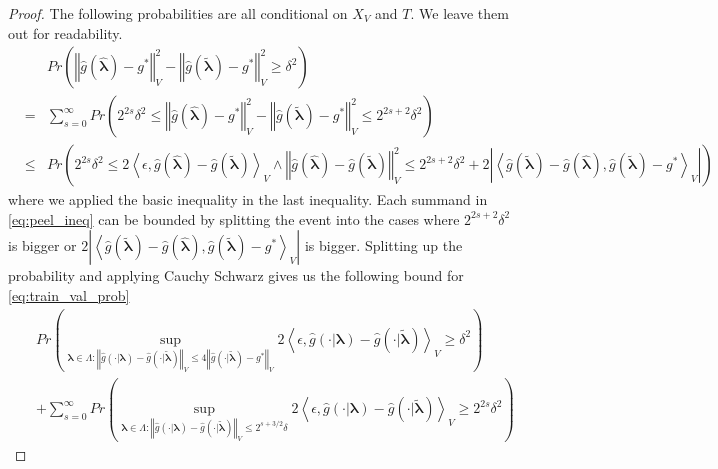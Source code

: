 \documentclass[12pt]{article}
\begin{document}
\begin{proof}
	The following probabilities are all conditional on $X_V$ and $T$. We leave them out for readability.
	\begin{eqnarray}
		&  & Pr\left(\left\Vert \hat{g}(\hat{\boldsymbol{\lambda}})-g^{*}\right\Vert _{V}^{2}-\left\Vert \hat{g}(\tilde{\boldsymbol{\lambda}})-g^{*}\right\Vert _{V}^{2}\ge\delta^{2}\right) \label{eq:train_val_prob}\\
		& = & \sum_{s=0}^{\infty}Pr\left(2^{2s}\delta^{2}\le\left\Vert \hat{g}(\hat{\boldsymbol{\lambda}})-g^{*}\right\Vert _{V}^{2}-\left\Vert \hat{g}(\tilde{\boldsymbol{\lambda}})-g^{*}\right\Vert _{V}^{2}\le2^{2s+2}\delta^{2}\right) 
		\label{eq:peeled} \\
		&\le&
		Pr\left(2^{2s}\delta^{2}\le2\left\langle \epsilon,\hat{g}(\hat{\boldsymbol{\lambda}})-\hat{g}(\tilde{\boldsymbol{\lambda}})\right\rangle _{V} \wedge
		\left\Vert \hat{g}(\hat{\boldsymbol{\lambda}})-\hat{g}(\tilde{\boldsymbol{\lambda}})\right\Vert_{V}^{2}\le2^{2s+2}\delta^{2}+
		2\left|\left\langle \hat{g}(\tilde{\boldsymbol{\lambda}})-\hat{g}(\hat{\boldsymbol{\lambda}}),\hat{g}(\tilde{\boldsymbol{\lambda}})-g^{*}\right\rangle _{V}\right| \right )
		\label{eq:peel_ineq}
	\end{eqnarray}
	where we applied the basic inequality in the last inequality.
	Each summand in \eqref{eq:peel_ineq} can be bounded by splitting the event into the cases where $2^{2s+2} \delta^2$ is bigger or $2\left|\left\langle \hat{g}(\tilde{\boldsymbol{\lambda}})-\hat{g}(\hat{\boldsymbol{\lambda}}),\hat{g}(\tilde{\boldsymbol{\lambda}})-g^{*}\right\rangle _{V}\right|$ is bigger. Splitting up the probability and applying Cauchy Schwarz gives us the following bound for \eqref{eq:train_val_prob}
	\begin{eqnarray}
	&& Pr\left(
	\sup_{\boldsymbol{\lambda} \in \Lambda: \left\Vert \hat{g}(\cdot|{\boldsymbol{\lambda}})-\hat{g}(\cdot|\tilde{\boldsymbol{\lambda}})\right\Vert _{V}
		\le
		4\left\Vert \hat{g}(\cdot|\tilde{\boldsymbol{\lambda}})-g^{*}\right\Vert _{V}}
	2\left\langle \epsilon,\hat{g}(\cdot|{\boldsymbol{\lambda}})-\hat{g}(\cdot|\tilde{\boldsymbol{\lambda}})\right\rangle _{V}
	\ge 
	\delta^{2}
	\right)
	\label{eq:train_val_1}
	\\
	&& + \sum_{s=0}^{\infty} Pr\left(
	\sup_{\boldsymbol{\lambda} \in \Lambda: \left\Vert \hat{g}(\cdot|{\boldsymbol{\lambda}})-\hat{g}(\cdot|\tilde{\boldsymbol{\lambda}})\right\Vert _{V}
		\le
		2^{s+3/2}\delta}
	2\left\langle \epsilon,\hat{g}(\cdot|{\boldsymbol{\lambda}})-\hat{g}(\cdot|\tilde{\boldsymbol{\lambda}})\right\rangle _{V}
	\ge
	2^{2s} \delta^{2}
	\right)
	\label{eq:train_val_2}
	\end{eqnarray}
	

\end{proof}
\end{document}
